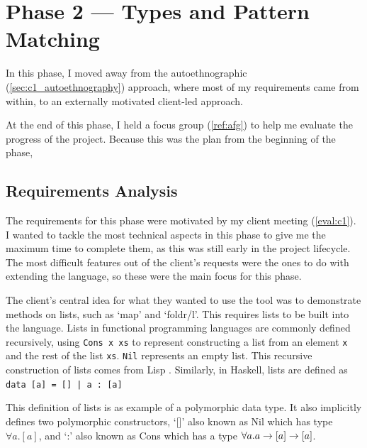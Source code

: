 \chapter{Phase 2 --- Types and Pattern Matching}
In this phase, I moved away from the autoethnographic (\ref{sec:c1_autoethnography}) approach, where most of my requirements came from within, to an externally motivated client-led approach. 


At the end of this phase, I held a focus group (\ref{ref:afg}) to help me evaluate the progress of the project. Because this was the plan from the beginning of the phase, 

\section{Requirements Analysis}
The requirements for this phase were motivated by my client meeting (\ref{eval:c1}). I wanted to tackle the most technical aspects in this phase to give me the maximum time to complete them, as this was still early in the project lifecycle. The most difficult features out of the client's requests were the ones to do with extending the language, so these were the main focus for this phase. 

The client's central idea for what they wanted to use the tool was to demonstrate methods on lists, such as `map' and `foldr/l'. This requires lists to be built into the language. Lists in functional programming languages are commonly defined recursively, using \verb|Cons x xs| to represent constructing a list from an element \verb|x| and the rest of the list \verb|xs|. \verb|Nil| represents an empty list. This recursive construction of lists comes from Lisp \cite{mccarthy1960recursivelisp}. Similarly, in Haskell, lists are defined as \verb!data [a] = [] | a : [a]! \\ 

This definition of lists is as example of a polymorphic data type. It also implicitly defines two polymorphic constructors, `[]' also known as Nil which has type $\forall a. [a]$, and `:' also known as Cons which has a type $\forall a. a \rightarrow [a] \rightarrow [a]$. 

